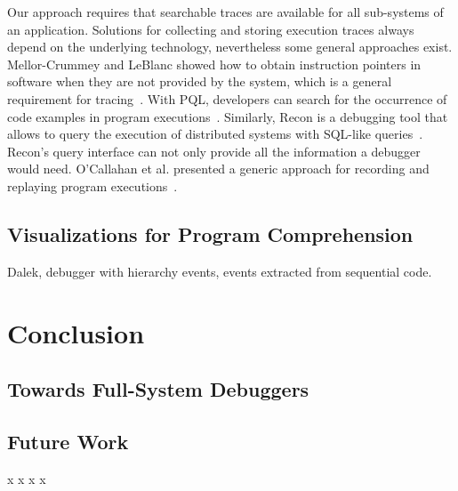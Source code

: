 Our approach requires that searchable traces are available for all sub-systems of an application.
Solutions for collecting and storing execution traces always depend on the underlying technology, nevertheless some general approaches exist.
Mellor-Crummey and LeBlanc showed how to obtain instruction pointers in software when they are not provided by the system, which is a general requirement for tracing~\cite{mellor-crummey_software_1989}.
With PQL, developers can search for the occurrence of code examples in program executions~\cite{martin_finding_2005}.
Similarly, Recon is a debugging tool that allows to query the execution of distributed systems with SQL-like queries~\cite{lee_unified_2011}.
Recon's query interface can not only provide all the information a debugger would need.
O'Callahan et al. presented a generic approach for recording and replaying program executions~\cite{ocallahan_engineering_2017}.


\section{Visualizations for Program Comprehension}
\label{sec:rw_visualization}

\cite{olsson91:sequential_debugging_at}
Dalek, debugger with hierarchy events, events extracted from sequential code.


\chapter{Conclusion}
\section{Towards Full-System Debuggers}


\section{Future Work}

\newpage
x
\newpage
x
\newpage
x
\newpage
x

